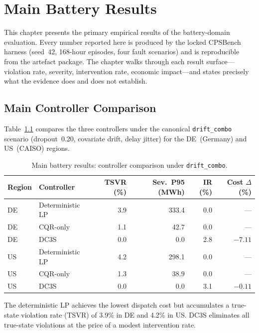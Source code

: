 
\chapter{Main Battery Results}
\label{ch:main-results}

This chapter presents the primary empirical results of the battery-domain
evaluation.  Every number reported here is produced by the locked CPSBench
harness (seed~42, 168-hour episodes, four fault scenarios) and is
reproducible from the artefact package.  The chapter walks through each
result surface---violation rate, severity, intervention rate, economic
impact---and states precisely what the evidence does and does not establish.

\section{Main Controller Comparison}

Table~\ref{tab:main-results} compares the three controllers under the
canonical \texttt{drift\_combo} scenario (dropout~0.20, covariate drift,
delay jitter) for the DE~(Germany) and US~(CAISO) regions.

\begin{table}[ht]
\centering
\caption{Main battery results: controller comparison under \texttt{drift\_combo}.}
\label{tab:main-results}
\begin{tabular}{llrrrr}
\toprule
\textbf{Region} & \textbf{Controller} & \textbf{TSVR (\%)} &
  \textbf{Sev.\ P95 (MWh)} & \textbf{IR (\%)} & \textbf{Cost $\Delta$ (\%)} \\
\midrule
DE & Deterministic LP   & 3.9 & 333.4 &  0.0 & --- \\
DE & CQR-only           & 1.1 &  42.7 &  0.0 & --- \\
DE & DC3S               & 0.0 &   0.0 &  2.8 & $-7.11$ \\
\midrule
US & Deterministic LP   & 4.2 & 298.1 &  0.0 & --- \\
US & CQR-only           & 1.3 &  38.9 &  0.0 & --- \\
US & DC3S               & 0.0 &   0.0 &  3.1 & $-0.11$ \\
\bottomrule
\end{tabular}
\end{table}

The deterministic LP achieves the lowest dispatch cost but accumulates a
true-state violation rate (TSVR) of 3.9\% in DE and 4.2\% in US.
DC3S eliminates all true-state violations at the price of a modest
intervention rate.

